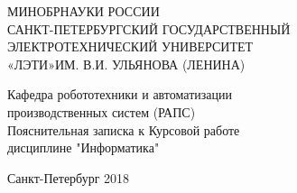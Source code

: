 \documentclass[russian,utf8,nocolumnxxxi,nocolumnxxxii]{eskdtext}
\begin{document}
\begin{center}
\hfill \break
\large{МИНОБРНАУКИ РОССИИ}\\
\footnotesize{САНКТ-ПЕТЕРБУРГСКИЙ ГОСУДАРСТВЕННЫЙ}\\ 
\footnotesize{ЭЛЕКТРОТЕХНИЧЕСКИЙ УНИВЕРСИТЕТ}\\
\footnotesize{«ЛЭТИ»ИМ. В.И. УЛЬЯНОВА (ЛЕНИНА)}\\
\hfill \break

 \hfill \break
\normalsize{Кафедра робототехники и автоматизации\\ производственных систем (РАПС)}\\
\hfill\break
\hfill \break
\hfill \break
\hfill \break
\large{Пояснительная записка к Курсовой работе}\\
 дисциплине "Информатика"\\
\hfill \break
\hfill \break


\hfill \break
\hfill \break
\end{center}
 

\hfill \break
\hfill \break
\begin{center} Санкт-Петербург 2018 \end{center}
\thispagestyle{empty} %
\newpage
\end{document}

